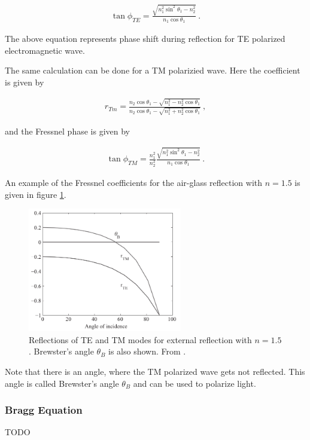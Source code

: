 \begin{align}
\tan \phi_{TE} = \frac{\sqrt{n_1^2 \sin^2 \theta_1 - n_2^2}}{n_1 \cos \theta_1} ~.
\end{align}

The above equation represents phase shift during reflection for TE polarized electromagnetic wave.

The same calculation can be done for a TM polarizied wave. Here the coefficient is given by

\begin{align}
r_{Tm} = \frac{n_2 \cos \theta_1 - \sqrt{n_1^2 - n_2^2 \cos \theta_1}}{n_2 \cos \theta_1 - \sqrt{n_1^2 + n_2^2 \cos \theta_1}}~,
\end{align}

and the Fressnel phase is given by

\begin{align}
\tan \phi_{TM} = \frac{n_1^2}{n_2^2} \frac{\sqrt{n_1^2 \sin^2 \theta_1 - n_2^2}}{n_1 \cos \theta_1} ~.
\end{align}

An example of the Fressnel coefficients for the air-glass reflection with $n =  1.5$ is given in figure \ref{fig:FressnelReflectionCoef}.

\begin{figure}[h!]
    \centering
    \includegraphics[width=0.6\textwidth]{figures/FressnelReflectionCoef.png}
    \caption{Reflections of TE and TM modes for external reflection with $n = 1.5$. Brewster’s angle $\theta_B$ is also shown. From \cite{wartak2013computational}.}
    \label{fig:FressnelReflectionCoef}
\end{figure}

Note that there is an angle, where the TM polarized wave gets not reflected. This angle is called Brewster’s angle $\theta_B$ and can be used to polarize light.

\subsubsection{Bragg Equation}


TODO
